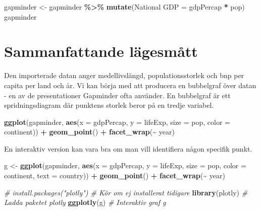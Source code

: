 \documentclass[
]{book}
\newenvironment{Shaded}{\begin{snugshade}}{\end{snugshade}}
\newcommand{\AttributeTok}[1]{\textcolor[rgb]{0.13,0.29,0.53}{#1}}
\newcommand{\CommentTok}[1]{\textcolor[rgb]{0.56,0.35,0.01}{\textit{#1}}}
\newcommand{\FunctionTok}[1]{\textcolor[rgb]{0.13,0.29,0.53}{\textbf{#1}}}
\newcommand{\NormalTok}[1]{#1}
\newcommand{\OtherTok}[1]{\textcolor[rgb]{0.56,0.35,0.01}{#1}}
\newcommand{\SpecialCharTok}[1]{\textcolor[rgb]{0.81,0.36,0.00}{\textbf{#1}}}
\newcommand{\StringTok}[1]{\textcolor[rgb]{0.31,0.60,0.02}{#1}}
\theoremstyle{definition}
\theoremstyle{definition}
\theoremstyle{definition}
\theoremstyle{definition}
\theoremstyle{remark}
\begin{document}
\begin{Shaded}
\begin{Highlighting}[]
\NormalTok{gapminder }\OtherTok{\textless{}{-}}\NormalTok{ gapminder }\SpecialCharTok{\%\textgreater{}\%} 
  \FunctionTok{mutate}\NormalTok{(}\StringTok{\textasciigrave{}}\AttributeTok{National GDP}\StringTok{\textasciigrave{}} \OtherTok{=}\NormalTok{ gdpPercap }\SpecialCharTok{*}\NormalTok{ pop)}
\NormalTok{gapminder}
\end{Highlighting}
\end{Shaded}

\section{Sammanfattande lägesmått}\label{sammanfattande-luxe4gesmuxe5tt}

Den importerade datan anger medellivslängd, populationsstorlek och bnp per capita per land och år. Vi kan börja med att producera en bubbelgraf över datan - en av de presentationer Gapminder ofta använder. En bubbelgraf är ett spridningsdiagram där punktens storlek beror på en tredje variabel.

\begin{Shaded}
\begin{Highlighting}[]
\FunctionTok{ggplot}\NormalTok{(gapminder, }\FunctionTok{aes}\NormalTok{(}\AttributeTok{x =}\NormalTok{ gdpPercap, }\AttributeTok{y =}\NormalTok{ lifeExp, }
                      \AttributeTok{size =}\NormalTok{ pop, }\AttributeTok{color =}\NormalTok{ continent)) }\SpecialCharTok{+}
  \FunctionTok{geom\_point}\NormalTok{() }\SpecialCharTok{+}
  \FunctionTok{facet\_wrap}\NormalTok{(}\SpecialCharTok{\textasciitilde{}}\NormalTok{ year)}
\end{Highlighting}
\end{Shaded}

En interaktiv version kan vara bra om man vill identifiera någon specifik punkt.

\begin{Shaded}
\begin{Highlighting}[]
\NormalTok{g }\OtherTok{\textless{}{-}} \FunctionTok{ggplot}\NormalTok{(gapminder, }\FunctionTok{aes}\NormalTok{(}\AttributeTok{x =}\NormalTok{ gdpPercap, }\AttributeTok{y =}\NormalTok{ lifeExp, }\AttributeTok{size =}\NormalTok{ pop, }
                           \AttributeTok{color =}\NormalTok{ continent, }\AttributeTok{text =}\NormalTok{ country)) }\SpecialCharTok{+}
  \FunctionTok{geom\_point}\NormalTok{() }\SpecialCharTok{+}
  \FunctionTok{facet\_wrap}\NormalTok{(}\SpecialCharTok{\textasciitilde{}}\NormalTok{ year)}

\CommentTok{\# install.packages("plotly")  \# Kör om ej installerat tidigare}
\FunctionTok{library}\NormalTok{(plotly)               }\CommentTok{\# Ladda paketet plotly}
\FunctionTok{ggplotly}\NormalTok{(g)                   }\CommentTok{\# Interaktiv graf g}
\end{Highlighting}
\end{Shaded}
\end{document}
